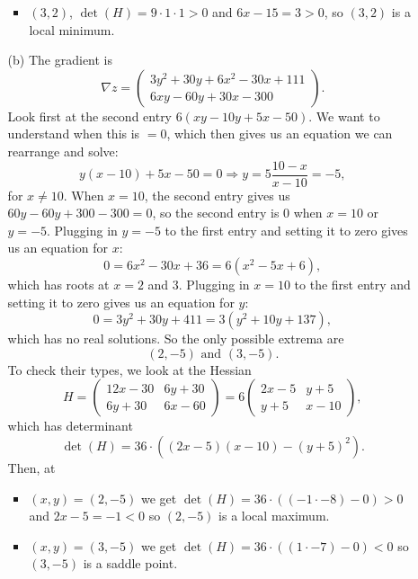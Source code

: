 \documentclass[11pt,a4paper]{scrartcl}
\begin{document}
\begin{enumerate}
\begin{itemize}
\begin{itemize}
			\item $(3,2)$, $\det(H) = 9\cdot 1 \cdot 1 > 0$ and $6x - 15 = 3 > 0$, so
			$(3,2)$ is a local minimum.
		\end{itemize}
		\item[(b)] The gradient is
		\[\nabla z = \left(\begin{array}{c}
		3y^2 + 30y + 6x^2 - 30x + 111 \\
		6xy - 60y + 30x - 300
		\end{array}\right).\]
		Look first at the second entry
		$6(xy-10y+5x-50)$.
		We want to understand when this is $=0$, 
		which then gives us an equation we can rearrange and solve:
		\[y(x-10) + 5x - 50 = 0 \Rightarrow y = 5\frac{10-x}{x-10} = -5,\]
		for $x \neq 10$. When $x = 10$,
		the second entry gives us
		$60y-60y + 300 - 300 = 0$,
		so the second entry is 0 when $x = 10$ or $y = -5$.
		Plugging in $y = -5$ to the first entry and setting it to 
		zero gives us an
		equation for $x$:
		\[0 = 6x^2 - 30x + 36 = 6(x^2 - 5x +6),\]
		which has roots at $x = 2$ and 3.
		Plugging in $x = 10$ to the first entry and setting it to zero
		gives us an equation for $y$:
		\[0 = 3y^2 + 30y + 411 = 3(y^2 + 10y + 137),\]
		which has no real solutions.
		So the only possible extrema are
		\[(2,-5) \text{ and } (3,-5).\]
		To check their types, we look at the Hessian
		\[H = \left(\begin{array}{cc}
		12x - 30 & 6y+30 \\
		6y +30 & 6x - 60
		\end{array}\right)
		=6\left(\begin{array}{cc}
		2x-5 & y + 5 \\
		y + 5 & x-10
		\end{array}\right),\]
		which has determinant 
		$$\det(H) = 36\cdot ((2x-5)(x-10)-(y+5)^2).$$
		Then, at
		\begin{itemize}
			\item $(x,y) = (2,-5)$ we get $\det(H) = 36\cdot ((-1\cdot-8) - 0) > 0$ and $2x-5 = -1 < 0$ so $(2,-5)$ is a local maximum.
			\item $(x,y) = (3,-5)$ we get $\det(H) = 36\cdot ((1\cdot -7) - 0) < 0$ so $(3,-5)$ is a saddle point.
		\end{itemize}
\end{itemize}
        

\end{enumerate}
\end{document}
